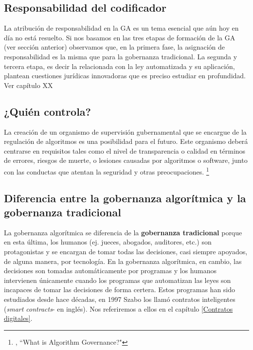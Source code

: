 \documentclass[12pt]{report} %
\begin{document}
\subsection{Responsabilidad del codificador}

La atribución de responsabilidad en la GA es un tema esencial que aún hoy en día no está resuelto. Si nos basamos en las tres etapas de formación de la GA (ver sección anterior) observamos que, en la primera fase, la asignación de responsabilidad es la misma que para la gobernanza tradicional. La segunda y tercera etapa, es decir la relacionada con la ley automatizada y su aplicación, plantean cuestiones jurídicas innovadoras que es preciso estudiar en profundidad. Ver capítulo XX

\subsection{¿Quién controla?}

La creación de un organismo de supervisión gubernamental que se encargue de la regulación de algoritmos es una posibilidad para el futuro. Este organismo deberá centrarse en requisitos tales como el nivel de transparencia o calidad en términos de errores, riesgos  de muerte, o lesiones causadas por algoritmos o software, junto con las conductas que atentan la seguridad y otras preocupaciones.  \footnote{\cite{Almeida2016}, “What is Algorithm Governance?"}

\subsection{ Diferencia entre la gobernanza algorítmica y la gobernanza tradicional}

La gobernanza algorítmica se diferencia de la \textbf{gobernanza tradicional}  porque en esta última, los humanos (ej. jueces, abogados, auditores, etc.) son protagonistas y se encargan de tomar todas las decisiones, casi siempre apoyados, de alguna manera, por tecnología. En la gobernanza algorítmica, en cambio, las decisiones son tomadas automáticamente por programas y los humanos intervienen únicamente cuando los programas que automatizan las leyes son incapaces de tomar las decisiones de forma certera. Estos programas han sido estudiados desde hace décadas, en 1997 Szabo  los llamó contratos inteligentes (\textit{smart contracts}- en inglés). Nos referiremos a ellos en el capítulo \ref{Contratos digitales}.
\end{document}

